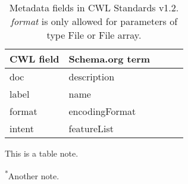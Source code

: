 \begin{table}[bt!]
\caption{Metadata fields in CWL Standards v1.2. \emph{format} is only allowed for parameters of type File or File array.}\label{tab:metadata_fields}
\begin{tabularx}{\linewidth}{L l l l l}
\toprule
CWL field & Schema.org term \\
\midrule
doc & description \\ %
label & name \\ %
format & encodingFormat \\
intent & featureList \\

\bottomrule
\end{tabularx}
\begin{tablenotes}
\item This is a table note.
\item \textsuperscript{*}Another note.
\end{tablenotes}
\end{table}